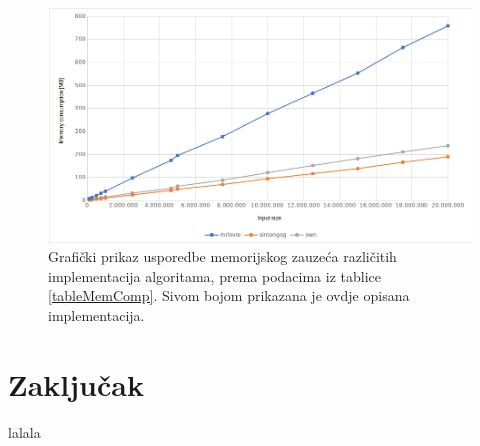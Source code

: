 \documentclass[a4paper,12pt]{article}
\begin{document}
\begin{figure}[h!]
	\begin{center}
		\includegraphics[width=\columnwidth]{memoryGraph.png}
 		\caption{Grafički prikaz usporedbe memorijskog zauzeća različitih implementacija algoritama, prema podacima iz tablice \ref{tableMemComp}. Sivom bojom prikazana je ovdje opisana implementacija.}
 		\label{fig:graphMemory}
	\end{center}
\end{figure}

\section{Zaključak}

lalala

\newpage




\end{document}
